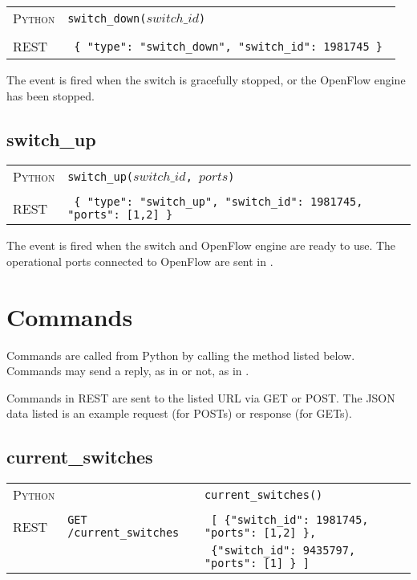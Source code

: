 \bigskip
\begin{tabularx}{\linewidth}{lX}
\textsc{Python}   & \texttt{switch\_down($switch\_id$)} \\ \\
\textsc{REST} & \texttt{ \{ "type": "switch\_down", "switch\_id": 1981745 \} } 
\end{tabularx}

The  event is fired when the switch is gracefully stopped, or the OpenFlow
engine has been stopped.  
 
\subsection{switch\_up}

\bigskip
\begin{tabularx}{\linewidth}{lX}
\textsc{Python}   & \texttt{switch\_up($switch\_id$, $ports$)} \\ \\
\textsc{REST} & \texttt{ \{ "type": "switch\_up", "switch\_id": 1981745, "ports": [1,2] \} } 
\end{tabularx}

The  event is fired when the switch and OpenFlow engine are ready to use.  The
operational ports connected to OpenFlow are sent in .  

\section{Commands}
\label{reference:commands}

Commands are called from Python by calling the method listed below.  Commands may send a reply, as in
 or not, as in .

Commands in REST are sent to the listed URL via GET or POST.  The JSON data listed is an example
request (for POSTs) or response (for GETs). 

\subsection{current\_switches}

\bigskip
\begin{tabularx}{\linewidth}{lXX}
\textsc{Python} &  & \texttt{current\_switches()} \\ \\
\textsc{REST} & \texttt{GET /current\_switches} & 
  \texttt{ [ \{"switch\_id": 1981745, "ports": [1,2] \}, } \\
  & & \texttt{ \{"switch\_id": 9435797, "ports": [1] \} ] } 
\end{tabularx}

